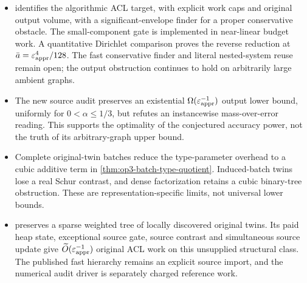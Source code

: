 \documentclass[11pt]{article}
\begin{document}
\begin{itemize}
row volume to below $2/\epsappr$. The proof uses finite prefix bounds,
even when the exact conservative obstacle cannot stabilize.
\item {} identifies the
algorithmic ACL target, with explicit work caps and original output
volume, with a significant-envelope finder for a proper conservative
obstacle. The small-component gate is implemented in near-linear
budget work. A quantitative Dirichlet comparison proves the reverse
reduction at $\bar a=\varepsilon_{\mathrm{appr}}^4/128$. The fast conservative finder
and literal nested-system reuse remain open; the output obstruction
continues to hold on arbitrarily large ambient graphs.
\item The new source audit preserves an existential
$\Omega(\varepsilon_{\mathrm{appr}}^{-1})$ output lower bound, uniformly for
$0<\alpha\leq1/3$, but refutes an instancewise mass-over-error reading.
This supports the optimality of the conjectured accuracy power, not the
truth of its arbitrary-graph upper bound.
\item Complete original-twin batches reduce the type-parameter overhead
to a cubic additive term in \cref{thm:op3-batch-type-quotient}.
Induced-batch twins lose a real Schur contrast, and dense factorization
retains a cubic binary-tree obstruction. These are representation-specific
limits, not universal lower bounds.
\item {} preserves a sparse weighted
tree of locally discovered original twins. Its paid heap state, exceptional
source gate, source contrast and simultaneous source update give
$\widetilde O(\varepsilon_{\mathrm{appr}}^{-1})$ original ACL work on this unsupplied
structural class. The published fast hierarchy remains an explicit source
import, and the numerical audit driver is separately charged reference work.
\end{itemize}


\end{document}
